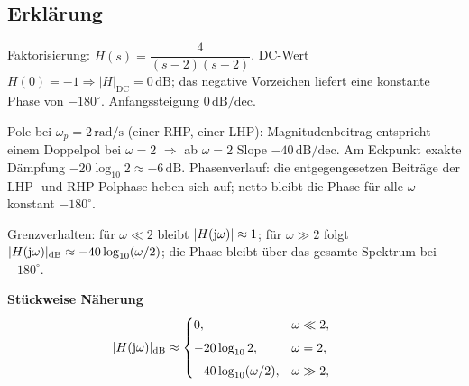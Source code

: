 \subsection{Erklärung}
\vspace{5mm}
\begin{description}[leftmargin=1.2em,labelsep=.6em,font=\bfseries]
\item[Schritt 1] Faktorisierung: $H(s)=\dfrac{4}{(s-2)(s+2)}$. DC-Wert $H(0)=-1\Rightarrow |H|_{\mathrm{DC}}=0\,\mathrm{dB}$; das negative Vorzeichen liefert eine konstante Phase von $-180^\circ$. Anfangssteigung $0\,\mathrm{dB/dec}$.
\item[Schritt 2] Pole bei $\omega_p=2\,\mathrm{rad/s}$ (einer RHP, einer LHP): Magnitudenbeitrag entspricht einem Doppelpol bei $\omega=2$ $\Rightarrow$ ab $\omega=2$ Slope $-40\,\mathrm{dB/dec}$. Am Eckpunkt exakte Dämpfung $-20\log_{10}2\approx-6\,\mathrm{dB}$. Phasenverlauf: die entgegengesetzen Beiträge der LHP- und RHP-Polphase heben sich auf; netto bleibt die Phase für alle $\omega$ konstant $-180^\circ$.
\item[Schritt 3] Grenzverhalten: für $\omega\ll2$ bleibt $|H(\operatorname{j}\!\omega)|\approx1$; für $\omega\gg2$ folgt $|H(\operatorname{j}\!\omega)|_{\mathrm{dB}}\approx-40\log_{10}(\omega/2)$; die Phase bleibt über das gesamte Spektrum bei $-180^\circ$.
\end{description}

\vspace{0.5cm}
\medskip
\noindent\textbf{Stückweise Näherung}
\[
|H(\operatorname{j}\!\omega)|_{\mathrm{dB}}\approx
\begin{cases}
0,& \omega\ll2,\\[4pt]
-20\log_{10}2,& \omega=2,\\[4pt]
-40\log_{10}(\omega/2),& \omega\gg2,
\end{cases}
\qquad
\]
\newpage